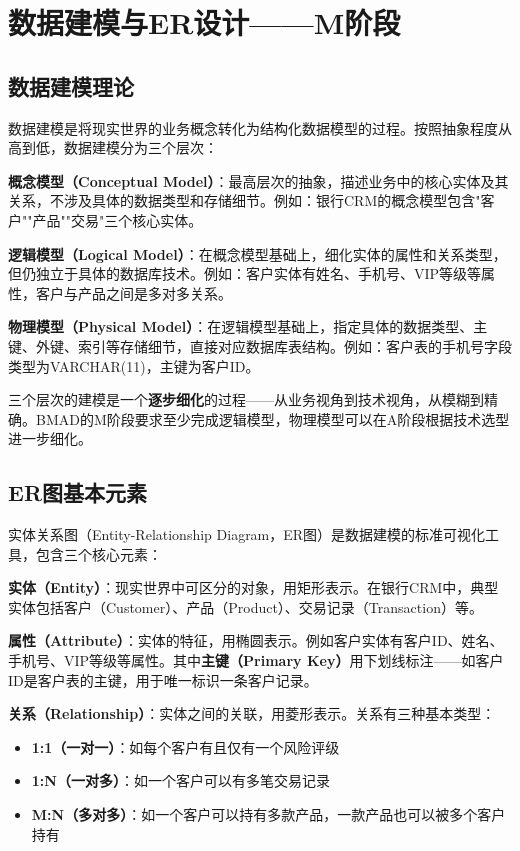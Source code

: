 \section{数据建模与ER设计——M阶段}

\subsection{数据建模理论}

数据建模是将现实世界的业务概念转化为结构化数据模型的过程。按照抽象程度从高到低，数据建模分为三个层次：

\textbf{概念模型（Conceptual Model）}：最高层次的抽象，描述业务中的核心实体及其关系，不涉及具体的数据类型和存储细节。例如：银行CRM的概念模型包含"客户""产品""交易"三个核心实体。

\textbf{逻辑模型（Logical Model）}：在概念模型基础上，细化实体的属性和关系类型，但仍独立于具体的数据库技术。例如：客户实体有姓名、手机号、VIP等级等属性，客户与产品之间是多对多关系。

\textbf{物理模型（Physical Model）}：在逻辑模型基础上，指定具体的数据类型、主键、外键、索引等存储细节，直接对应数据库表结构。例如：客户表的手机号字段类型为VARCHAR(11)，主键为客户ID。

三个层次的建模是一个\textbf{逐步细化}的过程——从业务视角到技术视角，从模糊到精确。BMAD的M阶段要求至少完成逻辑模型，物理模型可以在A阶段根据技术选型进一步细化。

\subsection{ER图基本元素}

实体关系图（Entity-Relationship Diagram，ER图）是数据建模的标准可视化工具，包含三个核心元素：

\textbf{实体（Entity）}：现实世界中可区分的对象，用矩形表示。在银行CRM中，典型实体包括客户（Customer）、产品（Product）、交易记录（Transaction）等。

\textbf{属性（Attribute）}：实体的特征，用椭圆表示。例如客户实体有客户ID、姓名、手机号、VIP等级等属性。其中\textbf{主键（Primary Key）}用下划线标注——如客户ID是客户表的主键，用于唯一标识一条客户记录。

\textbf{关系（Relationship）}：实体之间的关联，用菱形表示。关系有三种基本类型：
\begin{itemize}[leftmargin=2em]
  \item \textbf{1:1（一对一）}：如每个客户有且仅有一个风险评级
  \item \textbf{1:N（一对多）}：如一个客户可以有多笔交易记录
  \item \textbf{M:N（多对多）}：如一个客户可以持有多款产品，一款产品也可以被多个客户持有
\end{itemize}

